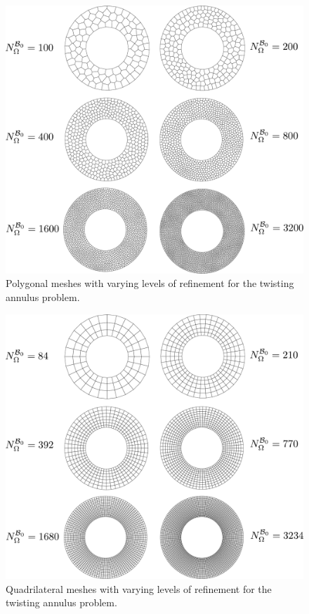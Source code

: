 \begin{figure}[!h]
  \centering
  \includegraphics[width=6.0in]{figures/annulus_meshes.pdf}
  \caption{Polygonal meshes with varying levels of refinement for the twisting annulus problem.}
  \label{fig:annulus_meshes}
\end{figure}

\begin{figure}[!h]
  \centering
  \includegraphics[width=6.0in]{figures/quad_annulus_meshes.pdf}
  \caption{Quadrilateral meshes with varying levels of refinement for the twisting annulus problem.}
  \label{fig:quad_annulus_meshes}
\end{figure}

